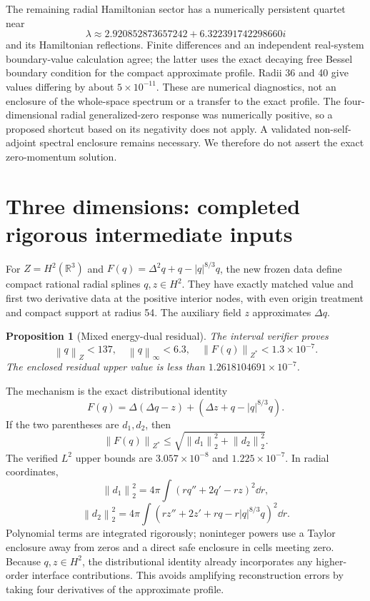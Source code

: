 \documentclass[11pt,a4paper]{article}
\newtheorem{proposition}[theorem]{Proposition}
\theoremstyle{remark}\newtheorem{remark}[theorem]{Remark}
\newcommand{\R}{\mathbb R}\newcommand{\C}{\mathbb C}
\newcommand{\norm}[1]{\left\|#1\right\|}
\begin{document}
The remaining radial Hamiltonian sector has a numerically persistent quartet near
\[\lambda\approx2.920852873657242+6.322391742298660i\]
and its Hamiltonian reflections. Finite differences and an independent real-system boundary-value calculation agree; the latter uses the exact decaying free Bessel boundary condition for the compact approximate profile. Radii 36 and 40 give values differing by about $5\times10^{-11}$. These are numerical diagnostics, not an enclosure of the whole-space spectrum or a transfer to the exact profile. The four-dimensional radial generalized-zero response was numerically positive, so a proposed shortcut based on its negativity does not apply. A validated non-self-adjoint spectral enclosure remains necessary. We therefore do not assert the exact zero-momentum solution.

\section{Three dimensions: completed rigorous intermediate inputs}
For $Z=H^2(\R^3)$ and $F(q)=\Delta^2q+q-|q|^{8/3}q$, the new frozen data define compact rational radial splines $q,z\in H^2$. They have exactly matched value and first two derivative data at the positive interior nodes, with even origin treatment and compact support at radius 54. The auxiliary field $z$ approximates $\Delta q$.

\begin{proposition}[Mixed energy-dual residual]
The interval verifier proves
\[
 \norm q_Z<137,\quad\norm q_\infty<6.3,
 \quad\norm{F(q)}_{Z^*}<1.3\times10^{-7}.
\]
The enclosed residual upper value is less than $1.2618104691\times10^{-7}$.
\end{proposition}
The mechanism is the exact distributional identity
\[
 F(q)=\Delta(\Delta q-z)+(\Delta z+q-|q|^{8/3}q).
\]
If the two parentheses are $d_1,d_2$, then
\[
 \norm{F(q)}_{Z^*}\le\sqrt{\norm{d_1}_2^2+\norm{d_2}_2^2}.
\]
The verified $L^2$ upper bounds are $3.057\times10^{-8}$ and $1.225\times10^{-7}$. In radial coordinates,
\[
 \norm{d_1}_2^2=4\pi\int(rq''+2q'-rz)^2\dd r,
\]
\[
 \norm{d_2}_2^2=4\pi\int(rz''+2z'+rq-r|q|^{8/3}q)^2\dd r.
\]
Polynomial terms are integrated rigorously; noninteger powers use a Taylor enclosure away from zeros and a direct safe enclosure in cells meeting zero. Because $q,z\in H^2$, the distributional identity already incorporates any higher-order interface contributions. This avoids amplifying reconstruction errors by taking four derivatives of the approximate profile.
\end{document}
